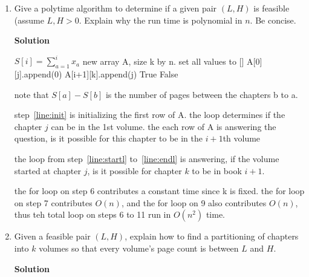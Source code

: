 \documentclass[letterpaper,12pt]{article}
\begin{document}
\begin{enumerate}
\begin{enumerate}
\item Give a polytime algorithm to determine if a given pair $(L, H)$ is feasible (assume $L, H >0 $. Explain why the run time is polynomial in $n$. Be concise. 


\textbf{Solution}




\begin{algorithmic}[1]
    \State \(S[i] = \sum_{a=1}^i x_a\)
    \State new array A, size k by n. set all values to []
     \label{line:init}
            \State A[0][j].append(0)
        \EndIf
    \EndFor
     \label{line:startl}
                        \State A[i+1][k].append(j)
                    \EndIf
                \EndFor
            \EndIf
        \EndFor
    \EndFor\label{line:endl}
        \State \Return True
    \EndIf
    \State \Return False
\end{algorithmic}

note that  \(S[a]-S[b]\) is the number of pages between the chapters b to a.

step~\ref{line:init} is initializing the first row of A. the loop determines if the chapter \(j\) can be in the 1st volume. the each row of A is answering the question, is it possible for this chapter to be in the \(i+1\)th volume

the loop from step~\ref{line:startl} to~\ref{line:endl} is answering, if the volume started at chapter \(j\), is it possible for chapter \(k\) to be in book \(i+1\). 

the for loop on step 6 contributes a constant time since k is fixed. the for loop on step 7 contributes \(O(n)\), and the for loop on 9 also contributes \(O(n)\), thus teh total loop on steps 6 to 11 run in \(O(n^2)\) time. 





\item Given a feasible pair $(L, H)$, explain how to find a partitioning of chapters into $k$ volumes so that every volume's page count is between $L$ and $H$. 

\textbf{Solution}


\end{enumerate}
\end{enumerate}
\end{document}

